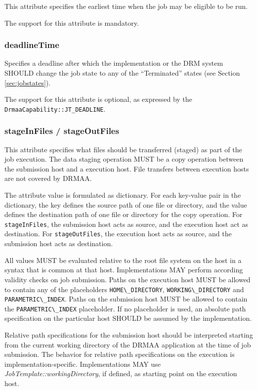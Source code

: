 \documentclass{article}
\newcommand{\h}[1]{\lstinline|#1|}
\begin{document}
This attribute specifies the earliest time when the job may be eligible to be run. 

The support for this attribute is mandatory.

\subsubsection{deadlineTime}

Specifies a deadline after which the implementation or the DRM system SHOULD change the job state to any of the \enquote{Terminated} states (see Section \ref{sec:jobstates}).

The support for this attribute is optional, as expressed by the \h{DrmaaCapability::JT_DEADLINE}.

\subsubsection{stageInFiles / stageOutFiles}

This attribute specifies what files should be transferred (staged) as part of the job execution. The data staging operation MUST be a copy operation between the submission host and a execution host. File transfers between execution hosts are not covered by DRMAA.

The attribute value is formulated as dictionary. For each key-value pair in the dictionary, the key defines the source path of one file or directory, and the value defines the destination path of one file or directory for the copy operation. For \h{stageInFiles}, the submission host acts as source, and the execution host act as destination.  For \h{stageOutFiles}, the execution host acts as source, and the submission host acts as destination. 

All values MUST be evaluated relative to the root file system on the host in a syntax that is common at that host. Implementations MAY perform according validity checks on job submission. Paths on the execution host MUST be allowed to contain any of the placeholders \h{HOME\_DIRECTORY}, \h{WORKING\_DIRECTORY} and \h{PARAMETRIC\_INDEX}. Paths on the submission host MUST be allowed to contain the \h{PARAMETRIC\_INDEX} placeholder. If no placeholder is used, an absolute path specification on the particular host SHOULD be assumed by the implementation. 

Relative path specifications for the submission host should be interpreted starting from the current working directory of the DRMAA application at the time of job submission. The behavior for relative path specifications on the execution is implementation-specific. Implementations MAY use \emph{JobTemplate::workingDirectory}, if defined, as starting point on the execution host.
\end{document}
